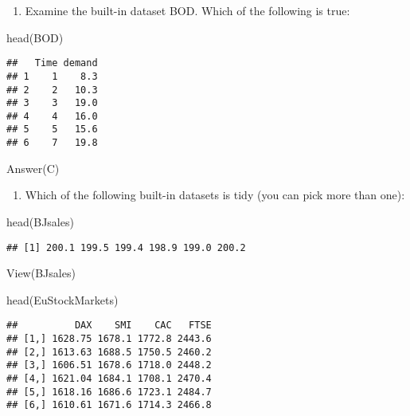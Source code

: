 \documentclass[
]{article}
\newenvironment{Shaded}{\begin{snugshade}}{\end{snugshade}}
\newcommand{\FunctionTok}[1]{\textcolor[rgb]{0.00,0.00,0.00}{#1}}
\newcommand{\NormalTok}[1]{#1}
\providecommand{\tightlist}{%
  \setlength{\itemsep}{0pt}\setlength{\parskip}{0pt}}
\begin{document}
\begin{enumerate}
\def\labelenumi{\arabic{enumi}.}
\setcounter{enumi}{2}
\tightlist
\item
  Examine the built-in dataset BOD. Which of the following is true:
\end{enumerate}

\begin{Shaded}
\begin{Highlighting}[]
\FunctionTok{head}\NormalTok{(BOD)}
\end{Highlighting}
\end{Shaded}

\begin{verbatim}
##   Time demand
## 1    1    8.3
## 2    2   10.3
## 3    3   19.0
## 4    4   16.0
## 5    5   15.6
## 6    7   19.8
\end{verbatim}

Answer(C)

\begin{enumerate}
\def\labelenumi{\arabic{enumi}.}
\setcounter{enumi}{3}
\tightlist
\item
  Which of the following built-in datasets is tidy (you can pick more
  than one):
\end{enumerate}

\begin{Shaded}
\begin{Highlighting}[]
\FunctionTok{head}\NormalTok{(BJsales)}
\end{Highlighting}
\end{Shaded}

\begin{verbatim}
## [1] 200.1 199.5 199.4 198.9 199.0 200.2
\end{verbatim}

\begin{Shaded}
\begin{Highlighting}[]
\FunctionTok{View}\NormalTok{(BJsales)}
\end{Highlighting}
\end{Shaded}

\begin{Shaded}
\begin{Highlighting}[]
\FunctionTok{head}\NormalTok{(EuStockMarkets)}
\end{Highlighting}
\end{Shaded}

\begin{verbatim}
##          DAX    SMI    CAC   FTSE
## [1,] 1628.75 1678.1 1772.8 2443.6
## [2,] 1613.63 1688.5 1750.5 2460.2
## [3,] 1606.51 1678.6 1718.0 2448.2
## [4,] 1621.04 1684.1 1708.1 2470.4
## [5,] 1618.16 1686.6 1723.1 2484.7
## [6,] 1610.61 1671.6 1714.3 2466.8
\end{verbatim}
\end{document}
